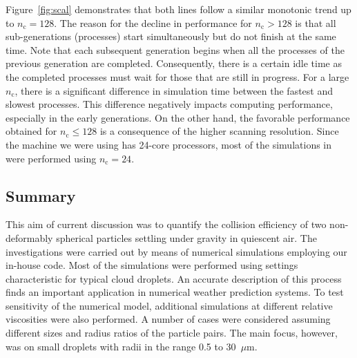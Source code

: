 \documentclass[../thesis.tex]{subfiles}
\begin{document}
Figure~\ref{fig:scal} demonstrates that both lines follow a similar monotonic trend up to $n_\text{c}=128$. The reason for the decline in performance for $n_\text{c}>128$ is that all sub-generations (processes) start simultaneously but do not finish at the same time. Note that each subsequent generation begins when all the processes of the previous generation are completed. Consequently, there is a certain idle time as the completed processes must wait for those that are still in progress. For a large $n_\text{c}$, there is a significant difference in simulation time between the fastest and slowest processes. This difference negatively impacts computing performance, especially in the early generations. On the other hand, the favorable performance obtained for $n_\text{c}\leq128$ is a consequence of the higher scanning resolution. Since the machine we were using has 24-core processors, most of the simulations in were performed using $n_\text{c}=24$.


\subsection{Summary}%
This aim of current discussion was to quantify the collision efficiency of two non-deformably spherical particles settling under gravity in quiescent air. The investigations were carried out by means of numerical simulations employing our in-house code. Most of the simulations were performed using settings characteristic for typical cloud droplets. An accurate description of this process finds an important application in numerical weather prediction systems. To test sensitivity of the numerical model, additional simulations at different relative viscosities were also performed. A number of cases were considered assuming different sizes and radius ratios of the particle pairs. The main focus, however, was on small droplets with radii in the range 0.5 to 30~$\mu$m.
\end{document}
